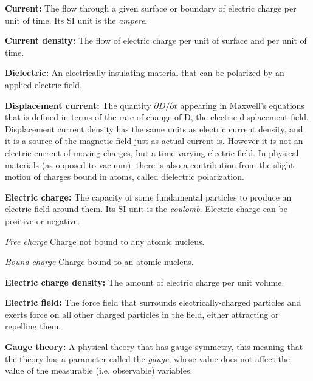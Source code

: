 \documentclass[english]{book}
\begin{document}
\begin{list}{}{}
	\item \textbf{Current:} The flow through a given surface or boundary of electric charge per unit of time. Its SI unit is the \emph{ampere}.
	
	\item \textbf{Current density:} The flow of electric charge per unit of surface and per unit of time.

	\item \textbf{Dielectric:} An electrically insulating material that can be polarized by an applied electric field.
	
	\item \textbf{Displacement current:} The quantity $\partial D / \partial t$ appearing in Maxwell's equations that is defined in terms of the rate of change of D, the electric displacement field. Displacement current density has the same units as electric current density, and it is a source of the magnetic field just as actual current is. However it is not an electric current of moving charges, but a time-varying electric field. In physical materials (as opposed to vacuum), there is also a contribution from the slight motion of charges bound in atoms, called dielectric polarization. 
	
	\item \textbf{Electric charge:} The capacity of some fundamental particles to produce an electric field around them. Its SI unit is the \emph{coulomb}. Electric charge can be positive or negative.
	\begin{list}{}{}
		\item \emph{Free charge} Charge not bound to any atomic nucleus.
		
		\item \emph{Bound charge} Charge bound to an atomic nucleus.
	\end{list}
	
	\item \textbf{Electric charge density:} The amount of electric charge per unit volume.
	
	\item \textbf{Electric field:} The force field that surrounds electrically-charged particles and exerts force on all other charged particles in the field, either attracting or repelling them.
	
	\item \textbf{Gauge theory:} A physical theory that has gauge symmetry, this meaning that the theory has a parameter called the \emph{gauge}, whose value does not affect the value of the measurable (i.e. observable) variables.
	

\end{list}
\end{document}

